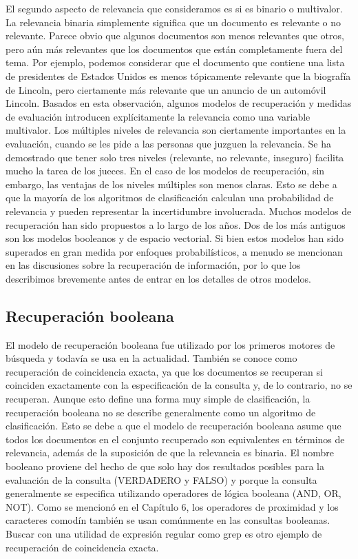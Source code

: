El segundo aspecto de relevancia que consideramos es si es binario o multivalor. La relevancia binaria simplemente significa que un documento es relevante o no relevante. Parece obvio que algunos documentos son menos relevantes que otros, pero aún más relevantes que los documentos que están completamente fuera del tema. Por ejemplo, podemos considerar que el documento que contiene una lista de presidentes de Estados Unidos es menos
tópicamente relevante que la biografía de Lincoln, pero ciertamente más relevante que un anuncio de un automóvil Lincoln. Basados ​​en esta observación, algunos modelos de recuperación y medidas de evaluación introducen explícitamente la relevancia como una variable multivalor. Los múltiples niveles de relevancia son ciertamente importantes en la evaluación, cuando se les pide a las personas que juzguen la relevancia. Se ha demostrado que tener solo tres niveles (relevante, no relevante, inseguro) facilita mucho la tarea de los jueces. En el caso de los modelos de recuperación, sin embargo, las ventajas de los niveles múltiples son menos claras. Esto se debe a que la mayoría de los algoritmos de clasificación calculan una probabilidad de relevancia y pueden representar la incertidumbre involucrada. Muchos modelos de recuperación han sido propuestos a lo largo de los años. Dos de los más antiguos son los modelos booleanos y de espacio vectorial. Si bien estos modelos han sido superados en gran medida por enfoques probabilísticos, a menudo se mencionan en las discusiones sobre la recuperación de información, por lo que los describimos brevemente antes de entrar en los detalles de otros modelos.

\subsection{Recuperación booleana}

El modelo de recuperación booleana fue utilizado por los primeros motores de búsqueda y todavía se usa en la actualidad. También se conoce como recuperación de coincidencia exacta, ya que los documentos se recuperan si coinciden exactamente con la especificación de la consulta y, de lo contrario, no se recuperan. Aunque esto define una forma muy simple de clasificación, la recuperación booleana no se describe generalmente como un algoritmo de clasificación. Esto se debe a que el modelo de recuperación booleana asume que todos los documentos en el conjunto recuperado son equivalentes en términos de relevancia, además de la suposición de que la relevancia es binaria. El nombre booleano proviene del hecho de que solo hay dos resultados posibles para la evaluación de la consulta (VERDADERO y FALSO) y porque la consulta generalmente se especifica utilizando operadores de lógica booleana (AND, OR, NOT). Como se mencionó en el Capítulo 6, los operadores de proximidad y los caracteres comodín también se usan comúnmente en las consultas booleanas. Buscar con una utilidad de expresión regular como grep es otro ejemplo de recuperación de coincidencia exacta.


